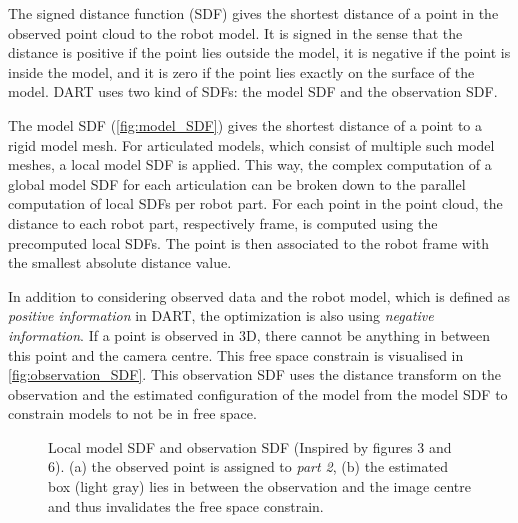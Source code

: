 The signed distance function (SDF) gives the shortest distance of a point in the observed point cloud to the robot model. It is signed in the sense that the distance is positive if the point lies outside the model, it is negative if the point is inside the model, and it is zero if the point lies exactly on the surface of the model. DART uses two kind of SDFs: the model SDF and the observation SDF.

The model SDF (\cref{fig:model_SDF}) gives the shortest distance of a point to a rigid model mesh. For articulated models, which consist of multiple such model meshes, a local model SDF is applied. This way, the complex computation of a global model SDF for each articulation can be broken down to the parallel computation of local SDFs per robot part. For each point in the point cloud, the distance to each robot part, respectively frame, is computed using the precomputed local SDFs. The point is then associated to the robot frame with the smallest absolute distance value.

In addition to considering observed data and the robot model, which is defined as \textit{positive information} in DART, the optimization is also using \textit{negative information}. If a point is observed in 3D, there cannot be anything in between this point and the camera centre. This free space constrain is visualised in \cref{fig:observation_SDF}. This observation SDF uses the distance transform on the observation and the estimated configuration of the model from the model SDF to constrain models to not be in free space.

\begin{figure}
\centering
{}
\caption[Signed Distance Function]{Local model SDF and observation SDF (Inspired by \cite{Schmidt2015} figures 3 and 6). (a) the observed point is assigned to \emph{part 2}, (b) the estimated box (light gray) lies in between the observation and the image centre and thus invalidates the free space constrain.}
\end{figure}

